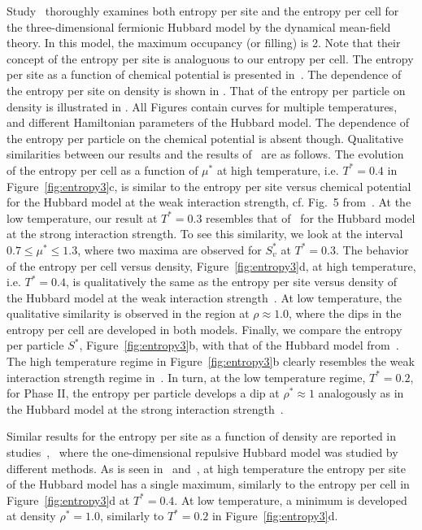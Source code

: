 \documentclass[entropy,article,submit,pdftex,moreauthors]{Definitions/mdpi}
\begin{document}
Study~\citep{dLBKGS11} thoroughly examines both entropy per site and the entropy per cell for the three-dimensional fermionic Hubbard model by the dynamical mean-field theory. In this model, the maximum occupancy (or filling) is 2. Note that their concept of the entropy per site is analoguous to our entropy per cell.
The entropy per site as a function of chemical potential is presented in~\citep[Figs.~5 and~6]{dLBKGS11}. The dependence of the entropy per site on density is shown in \citep[Fig.~7]{dLBKGS11}.
That of the entropy per particle on density is illustrated in \citep[Fig.~8]{dLBKGS11}. All Figures contain curves for multiple temperatures, and different Hamiltonian parameters of the Hubbard model.
The dependence of the entropy per particle on the chemical potential is absent though. Qualitative similarities between our results and the results of~\citep{dLBKGS11} are as follows. The evolution of the entropy per cell as a function of $\mu^*$ at high temperature, i.e. $T^*=0.4$ in Figure~\ref{fig:entropy3}c, is similar to the entropy per site versus chemical potential for the Hubbard model at the weak interaction strength, cf. Fig.~5 from~\citep{dLBKGS11}. At the low temperature, our result at $T^*=0.3$ resembles that of~\citep[Fig.~6]{dLBKGS11} for the Hubbard model at the strong interaction strength. To see this similarity, we look at the interval $0.7 \leq \mu^* \leq 1.3$, where two maxima are observed for $S^*_v$ at $T^*=0.3$. The behavior of the entropy per cell versus density, Figure~\ref{fig:entropy3}d, at high temperature, i.e. $T^*=0.4$, is qualitatively the same as the entropy per site versus density of the Hubbard model at the weak interaction strength~\citep[Fig.~7]{dLBKGS11}. At low temperature, the qualitative similarity is observed in the region at $\rho \approx 1.0$, where the dips in the entropy per cell are developed in both models. Finally, we compare the entropy per particle $S^*$, Figure~\ref{fig:entropy3}b, with that of the Hubbard model from~\citep[Fig.~7]{dLBKGS11}. The high temperature regime in Figure~\ref{fig:entropy3}b clearly resembles the weak interaction strength regime in~\citep[Fig.~7]{dLBKGS11}. In turn, at the low temperature regime, $T^*=0.2$, for Phase II, the entropy per particle develops a dip at $\rho^* \approx 1$ analogously as in the Hubbard model at the strong interaction strength~\citep[Fig.~7]{dLBKGS11}.

Similar results for the entropy per site as a function of density are reported in studies~\citep{Campo15},~\citep{PKF20} where the one-dimensional repulsive Hubbard model was studied by different methods. As is seen in~\citep[Fig.~4]{Campo15} and~\citep[Fig.21a]{PKF20}, at high temperature the entropy per site of the Hubbard model has a single maximum, similarly to the entropy per cell in Figure~\ref{fig:entropy3}d at $T^*=0.4$. At low temperature, a minimum is developed at density $\rho^*=1.0$, similarly to $T^*=0.2$ in Figure~\ref{fig:entropy3}d.
\end{document}
